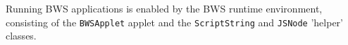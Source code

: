 Running BWS applications is enabled by the BWS runtime environment, consisting of the \texttt{BWSApplet} applet and the \texttt{ScriptString} and \texttt{JSNode} 'helper' classes.

